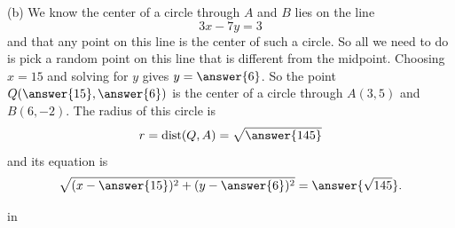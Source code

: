 \documentclass{ximera}
\newcommand{\pskip}{\vskip 0.1 in}
\begin{document}
\begin{example}
\begin{question}
\begin{explanation}
(b) We know the center of a circle through $A$ and $B$ lies on the line 
\[
    3x - 7y = 3
\]
and that any point on this line is the center of such a circle. So all we need to do is pick a random point on this line that is different from the midpoint. Choosing $x=15$ and solving for $y$ gives $y=\answer{6}$. So the point $Q(\answer{15},\answer{6})$ is the center of a circle through $A(3,5)$ and $B(6,-2)$. The radius of this circle is
\[
  r  =\text{dist}(Q,A) = \sqrt{\answer{145}}  
\]
and its equation is
\[
   \sqrt{(x-\answer{15})^2 + (y-\answer{6})^2} = \answer{\sqrt{145}} .
\]
\end{explanation}

\end{question}

\end{example}

\pskip
\end{document}
